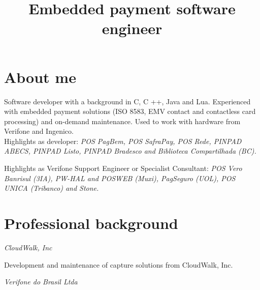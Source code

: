 \documentclass[11pt,a4paper,sans]{moderncv}
\title{\Large Embedded payment software\protect\\engineer}
\begin{document}
\maketitle

\section{About me}

\vspace{0.5mm}

\hspace{1.25cm} Software developer with a background in C, C ++, Java and Lua.
Experienced with embedded payment solutions (ISO 8583, EMV contact and
contactless card processing) and on-demand maintenance. Used to work with
hardware from Verifone and Ingenico.\protect\\

\hspace{1.25cm} Highlights as developer: \textit{POS PagBem, POS SafraPay, POS
Rede, PINPAD ABECS, PINPAD Listo, PINPAD Bradesco and Biblioteca Compartilhada
(BC).}

\hspace{1.25cm} Highlights as Verifone Support Engineer or Specialist
Consultant: \textit{POS Vero Banrisul (3IA), PW-HAL and POSWEB (Muxi),
PagSeguro (UOL), POS UNICA (Tribanco) and Stone.}

\section{Professional background}

\vspace{0.5mm}

\hspace{1.25cm} \textit{CloudWalk, Inc}


\hspace{1.25cm} \begin{minipage}[htb]{\linewidth - 1.25cm}
    Development and maintenance of capture solutions from CloudWalk, Inc.
\end{minipage}

\vspace{\baselineskip}

\hspace{1.25cm} \textit{Verifone do Brasil Ltda}
\end{document}
